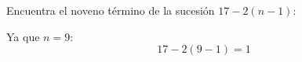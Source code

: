 Encuentra el noveno término de la sucesión $17-2(n-1)$:

\begin{solutionbox}{1.6cm}
    Ya que $n=9$:
    \[17-2(9-1)=1\]
\end{solutionbox}